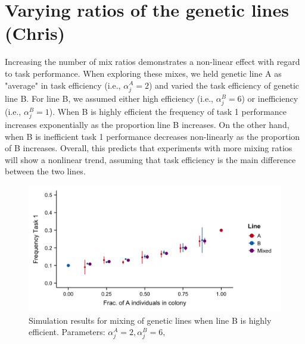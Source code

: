 \documentclass[11pt]{article}
\begin{document}

\newpage
\section{Varying ratios of the genetic lines (Chris)}
Increasing the number of mix ratios demonstrates a non-linear effect with regard to task performance. When exploring these mixes, we held genetic line A as "average" in task efficiency (i.e., $\alpha_j^A = 2$) and varied the task efficiency of genetic line B. For line B, we assumed either high efficiency (i.e., $\alpha_j^B = 6$) or inefficiency (i.e., $\alpha_j^B = 1$). When B is highly efficient the frequency of task 1 performance increases exponentially as the proportion line B increases. On the other hand, when B is inefficient task 1 performance decreases non-linearly as the proportion of B increases. Overall, this predicts that experiments with more mixing ratios will show a nonlinear trend, assuming that task efficiency is the main difference between the two lines. 

\begin{figure}[H]
    \centering
    \includegraphics[trim={0 0.25in 0 0.2in}, clip, width=0.9\linewidth]{doc/Mix_Alphas_B-super-efficient_Means.png}
    \caption{Simulation results for mixing of genetic lines when line B is highly efficient. Parameters: $\alpha_j^A = 2, \alpha_j^B = 6,$}
    \label{fig:Mix_Alphas_B-efficient}
\end{figure}
\end{document}
